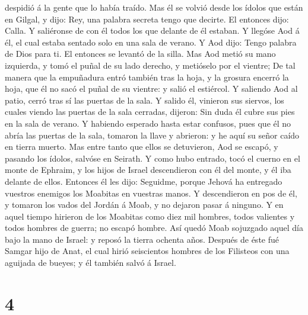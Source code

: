 despidió á la gente que lo había traído.  Mas él se
volvió desde los ídolos que están en Gilgal, y dijo: Rey, una palabra
secreta tengo que decirte. El entonces dijo: Calla. Y saliéronse de con
él todos los que delante de él estaban.  Y llegóse Aod á
él, el cual estaba sentado solo en una sala de verano. Y Aod dijo: Tengo
palabra de Dios para ti. El entonces se levantó de la silla.
 Mas Aod metió su mano izquierda, y tomó el puñal de su
lado derecho, y metióselo por el vientre;  De tal manera
que la empuñadura entró también tras la hoja, y la grosura encerró la
hoja, que él no sacó el puñal de su vientre: y salió el estiércol.
 Y saliendo Aod al patio, cerró tras sí las puertas de la
sala.  Y salido él, vinieron sus siervos, los cuales
viendo las puertas de la sala cerradas, dijeron: Sin duda él cubre sus
pies en la sala de verano.  Y habiendo esperado hasta
estar confusos, pues que él no abría las puertas de la sala, tomaron la
llave y abrieron: y he aquí su señor caído en tierra muerto.
 Mas entre tanto que ellos se detuvieron, Aod se escapó,
y pasando los ídolos, salvóse en Seirath.  Y como hubo
entrado, tocó el cuerno en el monte de Ephraim, y los hijos de Israel
descendieron con él del monte, y él iba delante de ellos.
 Entonces él les dijo: Seguidme, porque Jehová ha
entregado vuestros enemigos los Moabitas en vuestras manos. Y
descendieron en pos de él, y tomaron los vados del Jordán á Moab, y no
dejaron pasar á ninguno.  Y en aquel tiempo hirieron de
los Moabitas como diez mil hombres, todos valientes y todos hombres de
guerra; no escapó hombre.  Así quedó Moab sojuzgado aquel
día bajo la mano de Israel: y reposó la tierra ochenta años.
 Después de éste fué Samgar hijo de Anat, el cual hirió
seiscientos hombres de los Filisteos con una aguijada de bueyes; y él
también salvó á Israel.

\hypertarget{section-3}{%
\section{4}\label{section-3}}

